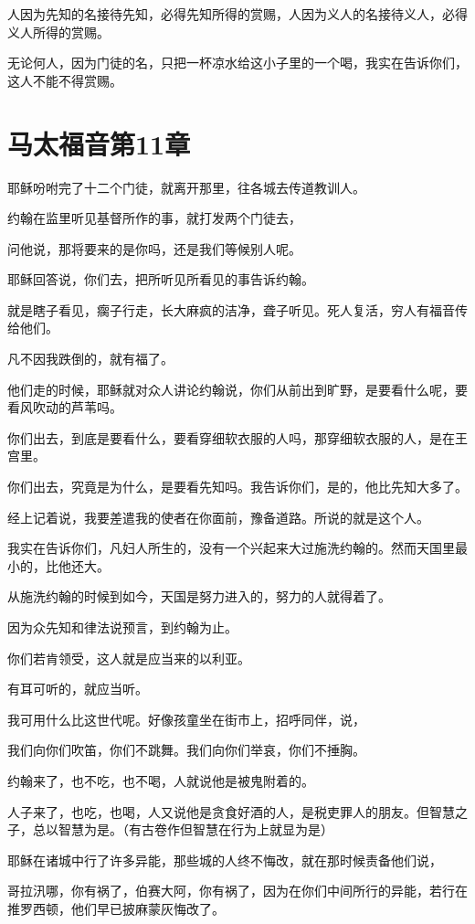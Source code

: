 \documentclass[12pt,oneside]{book}
\begin{document}
人因为先知的名接待先知，必得先知所得的赏赐，人因为义人的名接待义人，必得义人所得的赏赐。

无论何人，因为门徒的名，只把一杯凉水给这小子里的一个喝，我实在告诉你们，这人不能不得赏赐。

\chapter{马太福音第11章}
耶稣吩咐完了十二个门徒，就离开那里，往各城去传道教训人。

约翰在监里听见基督所作的事，就打发两个门徒去，

问他说，那将要来的是你吗，还是我们等候别人呢。

耶稣回答说，你们去，把所听见所看见的事告诉约翰。

就是瞎子看见，瘸子行走，长大麻疯的洁净，聋子听见。死人复活，穷人有福音传给他们。

凡不因我跌倒的，就有福了。

他们走的时候，耶稣就对众人讲论约翰说，你们从前出到旷野，是要看什么呢，要看风吹动的芦苇吗。

你们出去，到底是要看什么，要看穿细软衣服的人吗，那穿细软衣服的人，是在王宫里。

你们出去，究竟是为什么，是要看先知吗。我告诉你们，是的，他比先知大多了。

经上记着说，我要差遣我的使者在你面前，豫备道路。所说的就是这个人。

我实在告诉你们，凡妇人所生的，没有一个兴起来大过施洗约翰的。然而天国里最小的，比他还大。

从施洗约翰的时候到如今，天国是努力进入的，努力的人就得着了。

因为众先知和律法说预言，到约翰为止。

你们若肯领受，这人就是应当来的以利亚。

有耳可听的，就应当听。

我可用什么比这世代呢。好像孩童坐在街市上，招呼同伴，说，

我们向你们吹笛，你们不跳舞。我们向你们举哀，你们不捶胸。

约翰来了，也不吃，也不喝，人就说他是被鬼附着的。

人子来了，也吃，也喝，人又说他是贪食好酒的人，是税吏罪人的朋友。但智慧之子，总以智慧为是。（有古卷作但智慧在行为上就显为是）

耶稣在诸城中行了许多异能，那些城的人终不悔改，就在那时候责备他们说，

哥拉汛哪，你有祸了，伯赛大阿，你有祸了，因为在你们中间所行的异能，若行在推罗西顿，他们早已披麻蒙灰悔改了。
\end{document}
